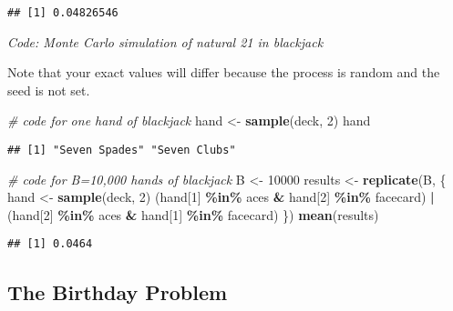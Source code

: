 \documentclass[
]{article}
\newenvironment{Shaded}{\begin{snugshade}}{\end{snugshade}}
\newcommand{\CommentTok}[1]{\textcolor[rgb]{0.56,0.35,0.01}{\textit{#1}}}
\newcommand{\DecValTok}[1]{\textcolor[rgb]{0.00,0.00,0.81}{#1}}
\newcommand{\KeywordTok}[1]{\textcolor[rgb]{0.13,0.29,0.53}{\textbf{#1}}}
\newcommand{\NormalTok}[1]{#1}
\newcommand{\OperatorTok}[1]{\textcolor[rgb]{0.81,0.36,0.00}{\textbf{#1}}}
\newcommand{\StringTok}[1]{\textcolor[rgb]{0.31,0.60,0.02}{#1}}
\begin{document}
\begin{verbatim}
## [1] 0.04826546
\end{verbatim}

\emph{Code: Monte Carlo simulation of natural 21 in blackjack}

Note that your exact values will differ because the process is random
and the seed is not set.

\begin{Shaded}
\begin{Highlighting}[]
\CommentTok{\# code for one hand of blackjack}
\NormalTok{hand \textless{}{-}}\StringTok{ }\KeywordTok{sample}\NormalTok{(deck, }\DecValTok{2}\NormalTok{)}
\NormalTok{hand}
\end{Highlighting}
\end{Shaded}

\begin{verbatim}
## [1] "Seven Spades" "Seven Clubs"
\end{verbatim}

\begin{Shaded}
\begin{Highlighting}[]
\CommentTok{\# code for B=10,000 hands of blackjack}
\NormalTok{B \textless{}{-}}\StringTok{ }\DecValTok{10000}
\NormalTok{results \textless{}{-}}\StringTok{ }\KeywordTok{replicate}\NormalTok{(B, \{}
\NormalTok{  hand \textless{}{-}}\StringTok{ }\KeywordTok{sample}\NormalTok{(deck, }\DecValTok{2}\NormalTok{)}
\NormalTok{  (hand[}\DecValTok{1}\NormalTok{] }\OperatorTok{\%in\%}\StringTok{ }\NormalTok{aces }\OperatorTok{\&}\StringTok{ }\NormalTok{hand[}\DecValTok{2}\NormalTok{] }\OperatorTok{\%in\%}\StringTok{ }\NormalTok{facecard) }\OperatorTok{|}\StringTok{ }\NormalTok{(hand[}\DecValTok{2}\NormalTok{] }\OperatorTok{\%in\%}\StringTok{ }\NormalTok{aces }\OperatorTok{\&}\StringTok{ }\NormalTok{hand[}\DecValTok{1}\NormalTok{] }\OperatorTok{\%in\%}\StringTok{ }\NormalTok{facecard)}
\NormalTok{\})}
\KeywordTok{mean}\NormalTok{(results)}
\end{Highlighting}
\end{Shaded}

\begin{verbatim}
## [1] 0.0464
\end{verbatim}

\hypertarget{the-birthday-problem}{%
\subsection{The Birthday Problem}\label{the-birthday-problem}}
\end{document}
